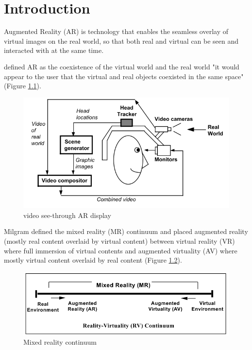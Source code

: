 \chapter{Introduction} %
\label{ch:intro} %


Augmented Reality (AR) is technology that enables the seamless overlay of virtual images on the real world, so that both real and virtual can be seen and interacted with at the same time. 

\cite{azuma1997survey} defined AR as the coexistence of the virtual world and the real world "it would appear to the user that the virtual and real objects coexisted in the same space" (Figure \ref{fig:video-see-through}).

\begin{figure}
    \centering
    \includegraphics[width=.8\linewidth]{images/video-see-through-ar.png}
    \caption{video see-through AR display}
    \label{fig:video-see-through}
\end{figure}

Milgram \cite{Milgram1995a} defined the mixed reality (MR) continuum and placed augmented reality (mostly real content overlaid by virtual content) between virtual reality (VR) where full immersion of virtual contents and augmented virtuality (AV) where mostly virtual content overlaid by real content (Figure \ref{fig:mr-continuum}). 

\begin{figure}
    \centering
    \includegraphics[width=.8\linewidth]{images/mixed-reality-continuum.png}
    \caption{Mixed reality continuum}
    \label{fig:mr-continuum}
\end{figure}

